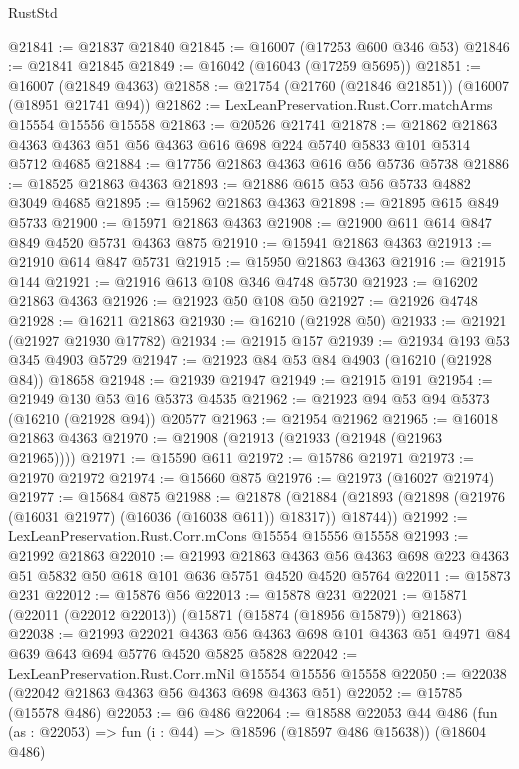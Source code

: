 \begin{lexlean}{RustStd}
\begin{coremodule}
@21841 := @21837 @21840
@21845 := @16007 (@17253 @600 @346 @53)
@21846 := @21841 @21845
@21849 := @16042 (@16043 (@17259 @5695))
@21851 := @16007 (@21849 @4363)
@21858 := @21754 (@21760 (@21846 @21851)) (@16007 (@18951 @21741 @94))
@21862 := LexLeanPreservation.Rust.Corr.matchArms @15554 @15556 @15558
@21863 := @20526 @21741
@21878 := @21862 @21863 @4363 @4363 @51 @56 @4363 @616 @698 @224 @5740 @5833 @101 @5314 @5712 @4685
@21884 := @17756 @21863 @4363 @616 @56 @5736 @5738
@21886 := @18525 @21863 @4363
@21893 := @21886 @615 @53 @56 @5733 @4882 @3049 @4685
@21895 := @15962 @21863 @4363
@21898 := @21895 @615 @849 @5733
@21900 := @15971 @21863 @4363
@21908 := @21900 @611 @614 @847 @849 @4520 @5731 @4363 @875
@21910 := @15941 @21863 @4363
@21913 := @21910 @614 @847 @5731
@21915 := @15950 @21863 @4363
@21916 := @21915 @144
@21921 := @21916 @613 @108 @346 @4748 @5730
@21923 := @16202 @21863 @4363
@21926 := @21923 @50 @108 @50
@21927 := @21926 @4748
@21928 := @16211 @21863
@21930 := @16210 (@21928 @50)
@21933 := @21921 (@21927 @21930 @17782)
@21934 := @21915 @157
@21939 := @21934 @193 @53 @345 @4903 @5729
@21947 := @21923 @84 @53 @84 @4903 (@16210 (@21928 @84)) @18658
@21948 := @21939 @21947
@21949 := @21915 @191
@21954 := @21949 @130 @53 @16 @5373 @4535
@21962 := @21923 @94 @53 @94 @5373 (@16210 (@21928 @94)) @20577
@21963 := @21954 @21962
@21965 := @16018 @21863 @4363
@21970 := @21908 (@21913 (@21933 (@21948 (@21963 @21965))))
@21971 := @15590 @611
@21972 := @15786 @21971
@21973 := @21970 @21972
@21974 := @15660 @875
@21976 := @21973 (@16027 @21974)
@21977 := @15684 @875
@21988 := @21878
    (@21884 (@21893 (@21898 (@21976 (@16031 @21977) (@16036 (@16038 @611)) @18317)) @18744))
@21992 := LexLeanPreservation.Rust.Corr.mCons @15554 @15556 @15558
@21993 := @21992 @21863
@22010 := @21993
    @21863
    @4363
    @56
    @4363
    @698
    @223
    @4363
    @51
    @5832
    @50
    @618
    @101
    @636
    @5751
    @4520
    @4520
    @5764
@22011 := @15873 @231
@22012 := @15876 @56
@22013 := @15878 @231
@22021 := @15871 (@22011 (@22012 @22013)) (@15871 (@15874 (@18956 @15879)) @21863)
@22038 := @21993
    @22021
    @4363
    @56
    @4363
    @698
    @101
    @4363
    @51
    @4971
    @84
    @639
    @643
    @694
    @5776
    @4520
    @5825
    @5828
@22042 := LexLeanPreservation.Rust.Corr.mNil @15554 @15556 @15558
@22050 := @22038 (@22042 @21863 @4363 @56 @4363 @698 @4363 @51)
@22052 := @15785 (@15578 @486)
@22053 := @6 @486
@22064 := @18588
    @22053
    @44
    @486
    (fun (as : @22053) => fun (i : @44) => @18596 (@18597 @486 @15638))
    (@18604 @486)

\end{coremodule}
\end{lexlean}
